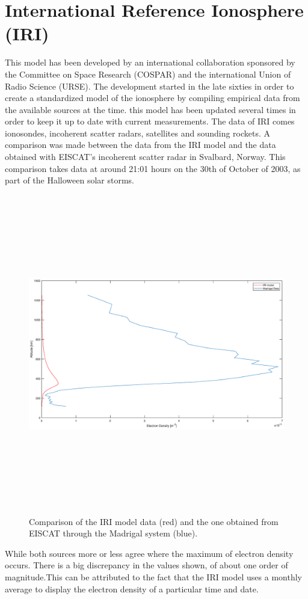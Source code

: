 \section{International Reference Ionosphere (IRI)}

This model has been developed by an international collaboration sponsored by the Committee on Space Research (COSPAR) and the international Union of Radio Science (URSE). The development started in the late sixties in order to create a standardized model of the ionosphere by compiling empirical data from the available sources at the time. this model has been updated several times  in order to keep it up to date with current measurements.
The data of IRI comes ionosondes, incoherent scatter radars, satellites and sounding rockets.
\newline
\newline
A comparison was made between the data from the IRI model and the data obtained with EISCAT's incoherent scatter radar in Svalbard, Norway. This comparison takes data at around 21:01 hours on the 30th of October of 2003, as part of the Halloween solar storms.

\begin{figure}[H]
	\centering
	\includegraphics[height=14cm, width=\textwidth]{figures/IRIandMadrigalNe.eps}
	\caption{Comparison of the IRI model data (red) and the one obtained from EISCAT through the Madrigal system (blue).}
	\label{fig::IRIvsMa}
\end{figure}

While both sources more or less agree where the maximum of electron density occurs. There is a big discrepancy in the values shown, of about one order of magnitude.This can be attributed to the fact that the IRI model uses a monthly average to display the electron density of a particular time and date.